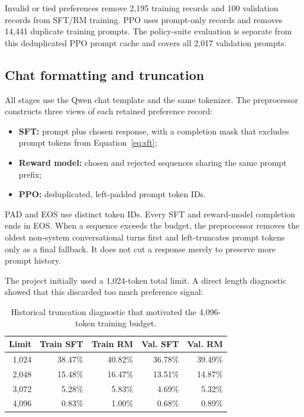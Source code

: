 \documentclass[11pt]{article}
\begin{document}
Invalid or tied preferences remove 2,195 training records and 100 validation
records from SFT/RM training. PPO uses prompt-only records and removes 14,441
duplicate training prompts. The policy-suite evaluation is separate from this
deduplicated PPO prompt cache and covers all 2,017 validation prompts.

\subsection{Chat formatting and truncation}

All stages use the Qwen chat template and the same tokenizer. The preprocessor
constructs three views of each retained preference record:

\begin{itemize}
  \item \textbf{SFT:} prompt plus chosen response, with a completion mask that
  excludes prompt tokens from Equation~\ref{eq:sft};
  \item \textbf{Reward model:} chosen and rejected sequences sharing the same
  prompt prefix;
  \item \textbf{PPO:} deduplicated, left-padded prompt token IDs.
\end{itemize}

PAD and EOS use distinct token IDs. Every SFT and reward-model completion ends
in EOS. When a sequence exceeds the budget, the preprocessor removes the
oldest non-system conversational turns first and left-truncates prompt tokens
only as a final fallback. It does not cut a response merely to preserve more
prompt history.

The project initially used a 1,024-token total limit. A direct length
diagnostic showed that this discarded too much preference signal:

\begin{table}[H]
\centering
\caption{Historical truncation diagnostic that motivated the 4,096-token
training budget.}
\label{tab:length-diagnostic}
\begin{tabular}{@{}rrrrr@{}}
\toprule
\textbf{Limit} &
\textbf{Train SFT} &
\textbf{Train RM} &
\textbf{Val. SFT} &
\textbf{Val. RM}\\
\midrule
1,024 & 38.47\% & 40.82\% & 36.78\% & 39.49\%\\
2,048 & 15.48\% & 16.47\% & 13.51\% & 14.87\%\\
3,072 & 5.28\% & 5.83\% & 4.69\% & 5.32\%\\
4,096 & 0.83\% & 1.00\% & 0.68\% & 0.89\%\\
\bottomrule
\end{tabular}
\end{table}
\end{document}

